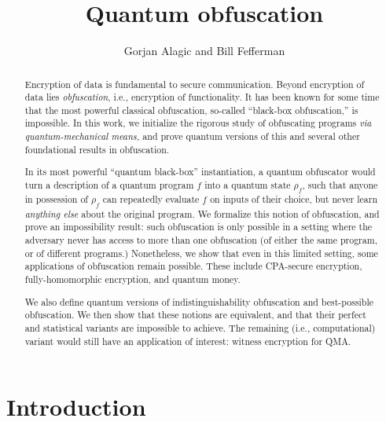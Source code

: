 \documentclass[11pt]{amsart}
\numberwithin{equation}{section}
\begin{document}
\title{Quantum obfuscation}
\author{Gorjan Alagic and Bill Fefferman}
\maketitle
\begin{abstract}
Encryption of data is fundamental to secure communication. Beyond encryption of data lies \emph{obfuscation}, i.e., encryption of functionality. It has been known for some time that the most powerful classical obfuscation, so-called ``black-box obfuscation,'' is impossible. In this work, we initialize the rigorous study of obfuscating programs \emph{via quantum-mechanical means,} and prove quantum versions of this and several other foundational results in obfuscation. 

In its most powerful ``quantum black-box'' instantiation, a quantum obfuscator would turn a description of a quantum program $f$ into a quantum state $\rho_f$, such that anyone in possession of $\rho_f$ can repeatedly evaluate $f$ on inputs of their choice, but never learn \emph{anything else} about the original program. We formalize this notion of obfuscation, and prove an impossibility result: such obfuscation is only possible in a setting where the adversary never has access to more than one obfuscation (of either the same program, or of different programs.) Nonetheless, we show that even in this limited setting, some applications of obfuscation remain possible. These include CPA-secure encryption, fully-homomorphic encryption, and quantum money. 

We also define quantum versions of indistinguishability obfuscation and best-possible obfuscation. We then show that these notions are equivalent, and that their perfect and statistical variants are impossible to achieve. The remaining (i.e., computational) variant would still have an application of interest: witness encryption for QMA.
\end{abstract}


\section{Introduction}\label{sec:intro}
\end{document}
